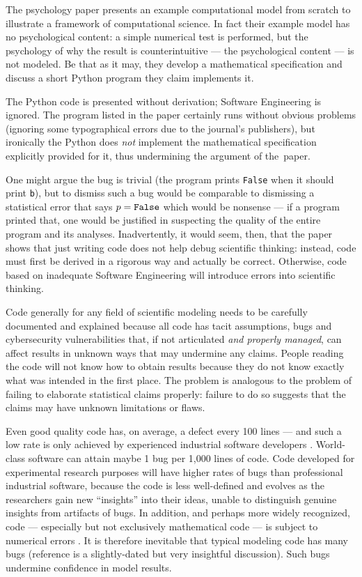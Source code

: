 \documentclass{comjnl}
\begin{document}
The psychology paper \cite{psychological-modeling} presents an example computational model from scratch to illustrate a framework of computational science. In fact their example model has no psychological content: a simple numerical test is performed, but the psychology of why the result is counterintuitive --- the psychological content --- is not modeled. Be that as it may, they develop a mathematical specification and discuss a short Python program they claim implements it. 

The Python code is presented without derivation; Software Engineering is ignored. The program listed in the paper certainly runs without obvious problems (ignoring some typographical errors due to the journal's publishers), but ironically the Python does \emph{not\/} implement the mathematical specification explicitly provided for it, thus undermining the argument of the~paper. 

One might argue the bug is trivial (the program prints \texttt{False} when it should print \texttt{b}), but to dismiss such a bug would be comparable to dismissing a statistical error that says $p=\mbox{\tt False}$ which would be nonsense --- if a program printed that, one would be justified in suspecting the quality of the entire program and its analyses. Inadvertently, it would seem, then, that the paper shows that just writing code does not help debug scientific thinking: instead, code must first be derived in a rigorous way and actually be correct. Otherwise, code based on inadequate Software Engineering will introduce errors into scientific thinking.

Code generally for any field of scientific modeling needs to be carefully documented and explained because all code has tacit assumptions, bugs and cybersecurity vulnerabilities \cite{Ben,nature-review,se-bias} that, if not articulated \emph{and properly managed}, can affect results in unknown ways that may undermine any claims. People reading the code will not know how to obtain results because they do not know exactly what was intended in the first place. The problem is analogous to the problem of failing to elaborate statistical claims properly: failure to do so suggests that the claims may have unknown limitations or flaws.

Even good quality code has, on average, a defect every 100 lines --- and {such a low} rate is only achieved by experienced industrial software developers \cite{ourReview}. World-class software can attain maybe 1 bug per 1,000 lines of code. Code developed for experimental research purposes will have higher rates of bugs than professional industrial software, because the code is less well-defined and evolves as the researchers gain new ``insights'' into their ideas, unable to distinguish genuine insights from artifacts of bugs. In addition, and perhaps more widely recognized, code --- especially but not exclusively mathematical code --- is subject to numerical errors \cite{hamming}. It is therefore inevitable that typical modeling code has many bugs (reference \cite{NVP} is a slightly-dated but very insightful discussion). Such bugs undermine confidence in model results. 
\end{document}
